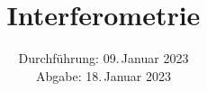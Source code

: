 

\subject{V64}
\title{Interferometrie}
\date{%
  Durchführung: 09.\,Januar 2023
  \\
  Abgabe: 18.\,Januar 2023
}



\maketitle
\thispagestyle{empty}
\tableofcontents
\newpage







\newpage
\printbibliography{}


